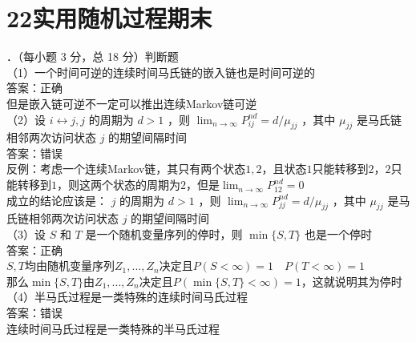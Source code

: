 \documentclass[UTF8,openany]{book}
\begin{document}
\section{\centering 22实用随机过程期末}
．（每小题 3 分，总 18 分）判断题\\
（1）一个时间可逆的连续时间马氏链的嵌入链也是时间可逆的\\
答案：正确\\
但是嵌入链可逆不一定可以推出连续Markov链可逆\\


\noindent （2）设 $i \leftrightarrow j, j$ 的周期为 $d>1$ ，则 $\lim _{n \rightarrow \infty} P_{i j}^{n d}=d / \mu_{j j}$ ，其中 $\mu_{j j}$ 是马氏链相邻两次访问状态 $j$ 的期望间隔时间\\
答案：错误\\
反例：考虑一个连续Markov链，其只有两个状态${1,2}$，且状态$1$只能转移到$2$，$2$只能转移到$1$，则这两个状态的周期为$2$，但是$\lim_{n \rightarrow \infty}P_{12}^{n d}=0$\\
成立的结论应该是： $j$ 的周期为 $d>1$ ，则 $\lim _{n \rightarrow \infty} P_{j j}^{n d}=d / \mu_{j j}$ ，其中 $\mu_{j j}$ 是马氏链相邻两次访问状态 $j$ 的期望间隔时间\\


\noindent （3）设 $S$ 和 $T$ 是一个随机变量序列的停时，则 $\min \{S, T\}$ 也是一个停时\\
答案：正确\\
$S,T$均由随机变量序列$Z_1,...,Z_n$决定且$P(S<\infty)=1 \quad P(T<\infty)=1$\\
那么$\min \{S,T\}$由$Z_1,...,Z_n$决定且$P(\min \{S,T\}<\infty)=1$，这就说明其为停时\\


\noindent （4）半马氏过程是一类特殊的连续时间马氏过程\\
答案：错误\\
连续时间马氏过程是一类特殊的半马氏过程\\
\end{document}

